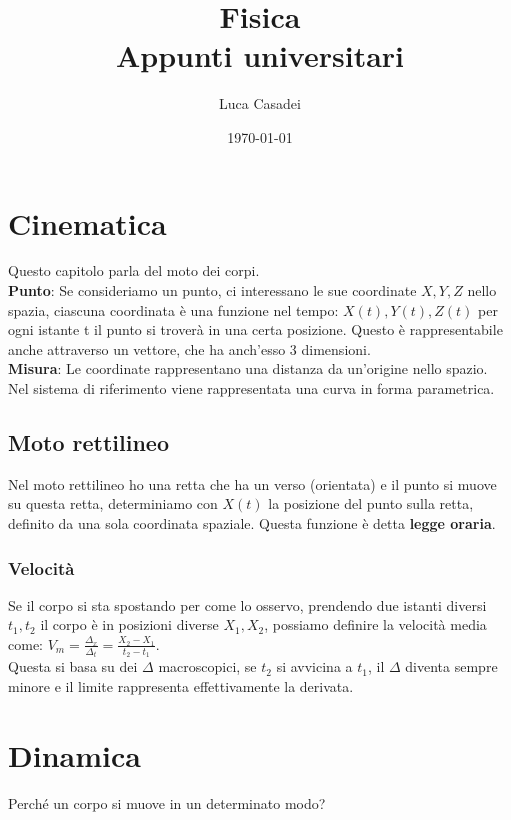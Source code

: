\documentclass[a4paper,12pt]{report}
\title{\textbf{Fisica}\\Appunti universitari}
\author{Luca Casadei}
\date{\today}
\begin{document}
	\maketitle
	\tableofcontents
	\chapter{Cinematica}
	Questo capitolo parla del moto dei corpi.\\
	\textbf{Punto}: Se consideriamo un punto, ci interessano le sue coordinate $\mathit{X,Y,Z}$ nello spazia, ciascuna coordinata è una funzione nel tempo:
	$\mathit{X(t),Y(t),Z(t)}$ per ogni istante t il punto si troverà in una certa posizione. Questo è rappresentabile anche attraverso un vettore, che ha anch'esso 3 dimensioni.\\
	\textbf{Misura}: Le coordinate rappresentano una distanza da un'origine nello spazio.
	Nel sistema di riferimento viene rappresentata una curva in forma parametrica.
	\section{Moto rettilineo}
	Nel moto rettilineo ho una retta che ha un verso (orientata) e il punto si muove su questa retta, determiniamo con $\mathit{X(t)}$ la posizione del punto sulla retta, definito da una sola coordinata spaziale. Questa funzione è detta \textbf{legge oraria}.
	\subsection{Velocità}
	Se il corpo si sta spostando per come lo osservo, prendendo due istanti diversi $\mathit{t_1,t_2}$ il corpo è in posizioni diverse $\mathit{X_1,X_2}$, possiamo definire la velocità media come: $\mathit{V_m = \frac{\Delta_x}{\Delta_t} = \frac{X_2 - X_1}{t_2 - t_1}}$.\\
	Questa si basa su dei $\mathit{\Delta}$ macroscopici, se $\mathit{t_2}$ si avvicina a $\mathit{t_1}$, il $\mathit{\Delta}$ diventa sempre minore e il limite rappresenta effettivamente la derivata.
	\chapter{Dinamica}
	Perché un corpo si muove in un determinato modo?
\end{document}
